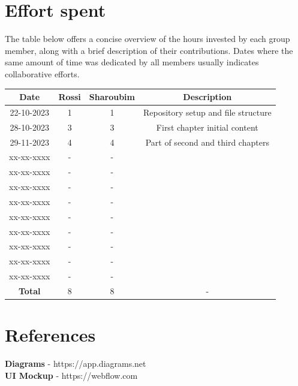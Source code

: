 \documentclass[12pt, a4paper]{report}
\begin{document}
\chapter{Effort spent}
    The table below offers a concise overview of the hours invested by each group member, along with a brief description of their contributions. 
    Dates where the same amount of time was dedicated by all members usually indicates collaborative efforts.
    \begin{table}[H]
        \centering
        \begin{tabular}{cccc}
            \textbf{Date}   & \textbf{Rossi}            & \textbf{Sharoubim}            & \textbf{Description}                          \\ \hline
            22-10-2023      & 1                         & 1                             & Repository setup and file structure           \\ 
            28-10-2023      & 3                         & 3                             & First chapter initial content                 \\ 
            29-11-2023      & 4                         & 4                             & Part of second and third chapters             \\
            xx-xx-xxxx      & -                         & -                             &                                               \\
            xx-xx-xxxx      & -                         & -                             &                                               \\
            xx-xx-xxxx      & -                         & -                             &                                               \\
            xx-xx-xxxx      & -                         & -                             &                                               \\
            xx-xx-xxxx      & -                         & -                             &                                               \\
            xx-xx-xxxx      & -                         & -                             &                                               \\
            xx-xx-xxxx      & -                         & -                             &                                               \\
            xx-xx-xxxx      & -                         & -                             &                                               \\
            xx-xx-xxxx      & -                         & -                             &                                               \\ \hline
            \textbf{Total}  & 8                         & 8                             & -                                             \\  
        \end{tabular}
    \end{table}

    \newpage 

\chapter{References}

    \textbf{Diagrams} - https://app.diagrams.net
    \\
    \textbf{UI Mockup} - https://webflow.com
\end{document}

